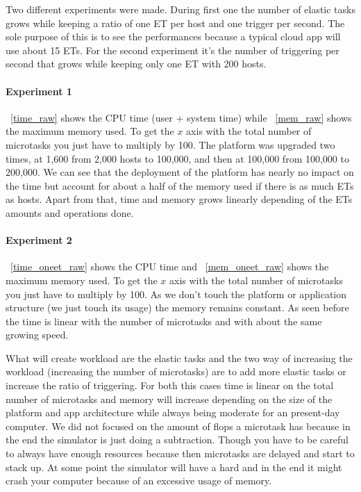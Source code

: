 \documentclass[a4paper, onecolumn]{article}
\begin{document}
  	Two different experiments were made. During first one the number of elastic 
  	tasks grows while keeping a ratio of one ET per host and one trigger per 
  	second. The sole purpose of this is to see the performances because a 
  	typical cloud app will use about 15 ETs. For the second experiment it's the 
  	number of triggering per second that grows while keeping only one ET with 
  	200 hosts.
    
    \paragraph{Experiment 1}
    \figurename~\ref{time_raw} shows the CPU time (user + system time) while
    \figurename~\ref{mem_raw} shows the maximum memory used. To get the $x$ axis
    with the total number of microtasks you just have to multiply by 100. The
    platform was upgraded two times, at 1,600 from 2,000 hosts to 100,000, and
    then at 100,000 from 100,000 to 200,000. We can see that the deployment of
    the platform has nearly no impact on the time but account for about a half
    of the memory used if there is as much ETs as hosts. Apart from that, time
    and memory grows linearly depending of the ETs amounts and operations done.
    
    \paragraph{Experiment 2}
    \figurename~\ref{time_oneet_raw} shows the CPU time and
    \figurename~\ref{mem_oneet_raw} shows the maximum memory used. To get the
    $x$ axis with the total number of microtasks you just have to multiply by
    100. As we don't touch the platform or application structure (we just touch
    its usage) the memory remains constant. As seen before the time is linear 
    with the number of microtasks and with about the same growing speed.
    
    What will create workload are the elastic tasks and the two way of 
    increasing the workload (increasing the number of microtasks) are to add 
    more elastic tasks or increase the ratio of triggering. For both this cases 
    time is linear on the total number of microtasks and memory will increase 
    depending on the size of the platform and app architecture while always 
    being moderate for an present-day computer. We did not focused on the 
    amount of flops a microtask has because in the end the simulator is just 
    doing a subtraction. Though you have to be careful to always have enough 
    resources because then microtasks are delayed and start to stack up. At 
    some point the simulator will have a hard and in the end it might crash 
    your computer because of an excessive usage of memory.
    
\end{document}

